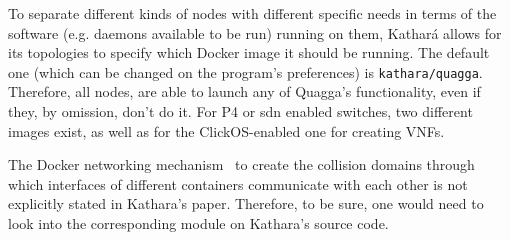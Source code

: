 To separate different kinds of nodes with different specific needs in terms of the software (e.g. daemons available to be run) running on them, Kathará allows for its topologies to specify which Docker image it should be running.
The default one (which can be changed on the program's preferences) is \texttt{kathara/quagga}. Therefore, all nodes, are able to launch any of Quagga's functionality, even if they, by omission, don't do it.
For P4 or \gls{sdn} enabled switches, two different images exist, as well as for the ClickOS-enabled one for creating VNFs.

The Docker networking mechanism~\cite{dockernetworking} to create the collision domains through which interfaces of different containers communicate with each other is not explicitly stated in Kathara's paper.
Therefore, to be sure, one would need to look into the corresponding module on Kathara's source code.


